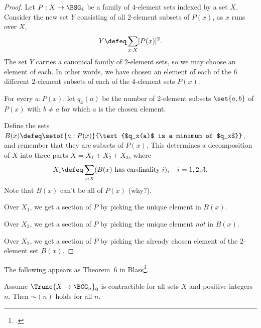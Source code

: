 \begin{proof}
  Let $P: X \to \BSG_4$ be a family of $4$-element sets indexed by a set $X$.
  Consider the new set $Y$ consisting of all $2$-element subsets
  of $P(x)$, as $x$ runs over $X$,
  \[
    Y \defeq \sum_{x:X}[P(x)]^2.
  \]
  The set $Y$ carries a canonical family of $2$-element sets,
  so we may choose an element of each.
  In other words, we have chosen an element of each of the $6$
  different $2$-element subsets of each of the $4$-element sets
  $P(x)$.

  For every $a : P(x)$, let $q_x(a)$ be the number of $2$-element
  subsets $\set{a,b}$ of $P(x)$ with $b\ne a$ for which $a$ is the
  chosen element.

  Define the sets $B(x) \defeq \setof{a:P(x)}{\text{$q_x(a)$ is a
      minimum of $q_x$}}$, and remember that they are subsets of $P(x)$.
  This determines a decomposition of $X$ into three parts $X = X_1 +
  X_2 + X_3$, where
  \[
    X_i \defeq \sum_{x:X}(\text{$B(x)$ has cardinality $i$}),
    \quad i = 1,2,3.
  \]
  Note that $B(x)$ can't be all of $P(x)$ (why?).

  Over $X_1$, we get a section of $P$ by picking the unique element
  in $B(x)$.

  Over $X_3$, we get a section of $P$ by picking the unique element
  \emph{not} in $B(x)$.

  Over $X_2$, we get a section of $P$ by picking the already chosen
  element of the $2$-element set $B(x)$.
\end{proof}

The following appears as Theorem~6 in Blass\footcite{Blass-Finite-Choice}.
\begin{theorem}
  Assume $\Trunc{X \to \BCG_n}_0$ is contractible for all sets $X$ and
  positive integers $n$. Then $\AC(n)$ holds for all $n$.
\end{theorem}

